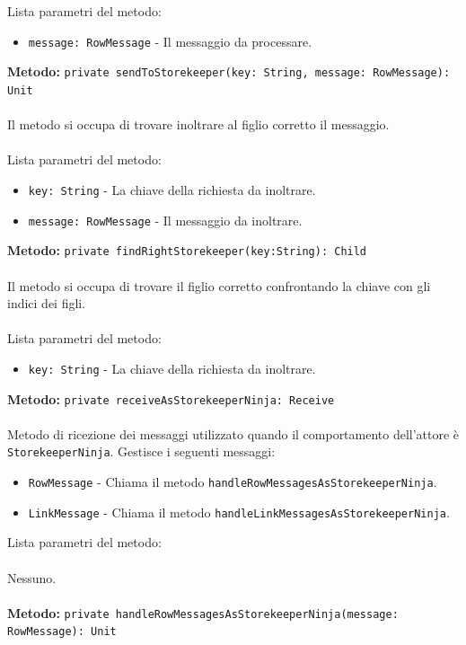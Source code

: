 \documentclass[a4paper]{article}
\begin{document}
			Lista parametri del metodo:
			\begin{itemize}
				\item \texttt{message: RowMessage} - Il messaggio da processare.
			\end{itemize}
		\textbf{Metodo: }\texttt{private sendToStorekeeper(key: String, message: RowMessage): Unit}
			\\ \\
			Il metodo si occupa di trovare inoltrare al figlio corretto il messaggio.
			\\ \\
			Lista parametri del metodo:
			\begin{itemize}
				\item \texttt{key: String} - La chiave della richiesta da inoltrare.
				\item \texttt{message: RowMessage} - Il messaggio da inoltrare.
			\end{itemize}
		\textbf{Metodo: }\texttt{private findRightStorekeeper(key:String): Child}
			\\ \\
			Il metodo si occupa di trovare il figlio corretto confrontando la chiave con gli indici dei figli.
			\\ \\
			Lista parametri del metodo:
			\begin{itemize}
				\item \texttt{key: String} - La chiave della richiesta da inoltrare.
			\end{itemize}
		\textbf{Metodo: }\texttt{private receiveAsStorekeeperNinja: Receive}
			\\ \\
			Metodo di ricezione dei messaggi utilizzato quando il comportamento dell'attore è \texttt{StorekeeperNinja}. Gestisce i seguenti messaggi:
			\begin{itemize}
				\item \texttt{RowMessage} - Chiama il metodo \texttt{handleRowMessagesAsStorekeeperNinja}.
				\item \texttt{LinkMessage} - Chiama il metodo \texttt{handleLinkMessagesAsStorekeeperNinja}.
			\end{itemize}
			Lista parametri del metodo:
			\\ \\
			Nessuno.
			\\ \\		
		\textbf{Metodo: }\texttt{private handleRowMessagesAsStorekeeperNinja(message: RowMessage): Unit}
\end{document}

